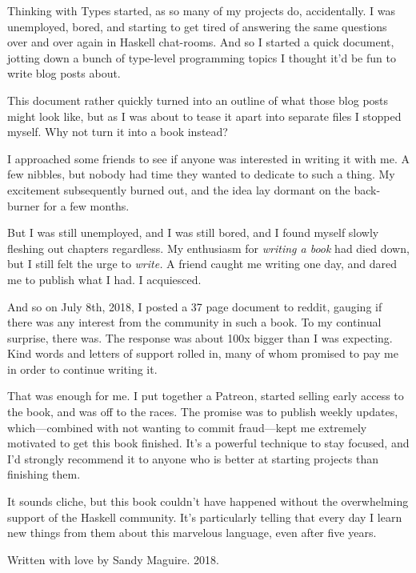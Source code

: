 \documentclass[book.tex]{subfiles}
\begin{document}

Thinking with Types started, as so many of my projects do, accidentally. I was
unemployed, bored, and starting to get tired of answering the same questions
over and over again in Haskell chat-rooms. And so I started a quick document,
jotting down a bunch of type-level programming topics I thought it'd be fun to
write blog posts about.

This document rather quickly turned into an outline of what those blog posts
might look like, but as I was about to tease it apart into separate files I
stopped myself. Why not turn it into a book instead?

I approached some friends to see if anyone was interested in writing it with me.
A few nibbles, but nobody had time they wanted to dedicate to such a thing. My
excitement subsequently burned out, and the idea lay dormant on the
back-burner for a few months.

But I was still unemployed, and I was still bored, and I found myself slowly
fleshing out chapters regardless. My enthusiasm for \emph{writing a book} had
died down, but I still felt the urge to \emph{write.} A friend caught me writing
one day, and dared me to publish what I had. I acquiesced.

And so on July 8th, 2018, I posted a 37 page document to reddit, gauging if
there was any interest from the community in such a book. To my continual
surprise, there was. The response was about 100x bigger than I was expecting.
Kind words and letters of support rolled in, many of whom promised to pay me in
order to continue writing it.

That was enough for me. I put together a Patreon, started selling early access
to the book, and was off to the races. The promise was to publish weekly
updates, which---combined with not wanting to commit fraud---kept me extremely
motivated to get this book finished. It's a powerful technique to stay focused,
and I'd strongly recommend it to anyone who is better at starting projects than
finishing them.

It sounds cliche, but this book couldn't have happened without the overwhelming
support of the Haskell community. It's particularly telling that every day I
learn new things from them about this marvelous language, even after five years.

Written with love by Sandy Maguire. 2018.
\end{document}
